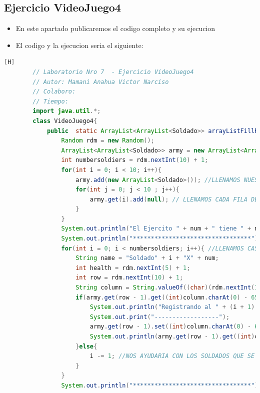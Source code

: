\documentclass{article}
\begin{document}
	\subsection{Ejercicio VideoJuego4}
	\begin{itemize}	
		\item En este apartado publicaremos el codigo completo y su ejecucion 
		\item El codigo y la ejecucion seria el siguiente:
	\end{itemize}	
	\begin{lstlisting}[language=java,caption={Las lineas de codigos del metodo creado:}][H]
		// Laboratorio Nro 7  - Ejercicio VideoJuego4
		// Autor: Mamani Anahua Victor Narciso
		// Colaboro:
		// Tiempo:
		import java.util.*;
		class VideoJuego4{  
			public  static ArrayList<ArrayList<Soldado>> arrayListFillRegister(int num){
				Random rdm = new Random();
				ArrayList<ArrayList<Soldado>> army = new ArrayList<ArrayList<Soldado>>();
				int numbersoldiers = rdm.nextInt(10) + 1;
				for(int i = 0; i < 10; i++){
					army.add(new ArrayList<Soldado>()); //LLENAMOS NUESTROS ARRAYLIST BIDIMENSIONAL CON CADA FILA PARA QUE CUMPLAN CON ESTRUCTURA DEL TABLERO
					for(int j = 0; j < 10 ; j++){
						army.get(i).add(null); // LLENAMOS CADA FILA DEL ARRAYLIST CON UN OBJETO SOLDADO CON TAL QUE ESTE SEA NULL PARA QUE SEPA QUE ESTE TIENE UNA CASILLA PERO NO HAY NADIE TODAVIA SE PUEDE LLENAR 
					}
				}
				System.out.println("El Ejercito " + num + " tiene " + numbersoldiers + " soldados : " ); 
				System.out.println("*********************************");
				for(int i = 0; i < numbersoldiers; i++){ //LLENAMOS CASILLAS CON CADA SOLDADO CREADO ALEATORIAMENTE
					String name = "Soldado" + i + "X" + num;
					int health = rdm.nextInt(5) + 1;
					int row = rdm.nextInt(10) + 1;
					String column = String.valueOf((char)(rdm.nextInt(10) + 65)); //REUTILIZAMOS CODIGO DEL ANTERIOR ARCHIVO VIDEOJUEGO3.JAVA YA QUE TENDRIAN LA MISMA FUNCIONALIDAD
					if(army.get(row - 1).get((int)column.charAt(0) - 65) == null){
						System.out.println("Registrando al " + (i + 1) + " soldado del Ejercito " + num + "");
						System.out.print("------------------");
						army.get(row - 1).set((int)column.charAt(0) - 65, new Soldado(name, health, row, column));
						System.out.println(army.get(row - 1).get((int)column.charAt(0) - 65).toString());
					}else{
						i -= 1; //NOS AYUDARIA CON LOS SOLDADOS QUE SE REPITEN EN EL MISMO CASILLERO CON TAL QUE NO DEBERIA CONTAR 
					}
				}
				System.out.println("*********************************");

\end{lstlisting}
\end{document}
